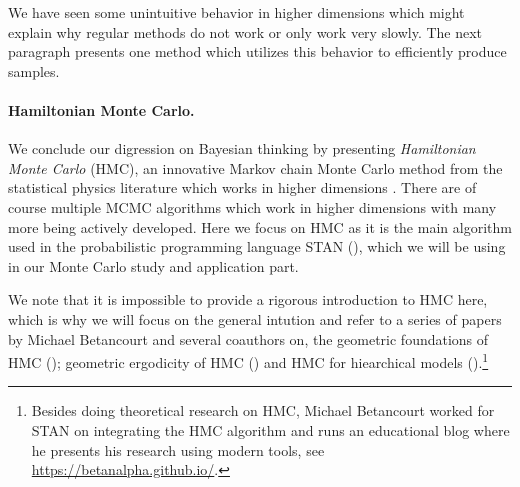 We have seen some unintuitive behavior in higher dimensions which might explain why regular methods do not work or only work very slowly.
The next paragraph presents one method which utilizes this behavior to efficiently produce samples.

\paragraph{Hamiltonian Monte Carlo.}
We conclude our digression on Bayesian thinking by presenting \emph{Hamiltonian Monte Carlo} (HMC), an innovative Markov chain Monte Carlo method from the statistical physics literature which works in higher dimensions  \citet{duane87}.
There are of course multiple MCMC algorithms which work in higher dimensions with many more being actively developed.
Here we focus on HMC as it is the main algorithm used in the probabilistic programming language STAN (\citet{standev2018stancore}), which we will be using in our Monte Carlo study and application part.

We note that it is impossible to provide a rigorous introduction to HMC here, which is why we will focus on the general intution and refer to a series of papers by Michael Betancourt and several coauthors on, the geometric foundations of HMC (\citet{betancourt2014geometric}); geometric ergodicity of HMC (\citet{livingstone2016geometric}) and HMC for hiearchical models (\citet{betancourt2013hamiltonian}).\footnote{Besides doing theoretical research on HMC, Michael Betancourt worked for STAN on integrating the HMC algorithm and runs an educational blog where he presents his research using modern tools, see \url{https://betanalpha.github.io/}.}

